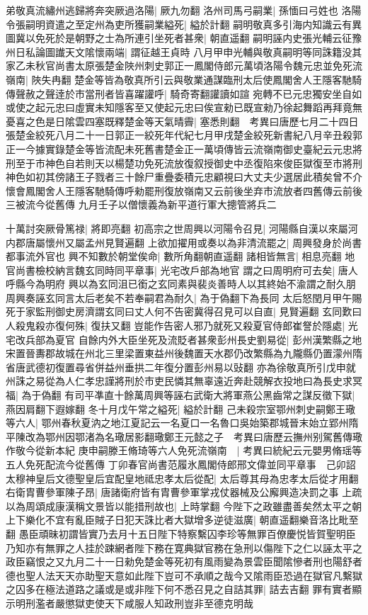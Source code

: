 弟敬真流繡州逃歸將奔突厥過洛陽|{
	厥九勿翻}
洛州司馬弓嗣業|{
	孫愐曰弓姓也}
洛陽令張嗣明資遣之至定州為吏所獲嗣業縊死|{
	縊於計翻}
嗣明敬真多引海内知識云有異圖冀以免死於是朝野之士為所連引坐死者甚衆|{
	朝直遥翻}
嗣明誣内史張光輔云征豫州日私論圖䜟天文隂懷兩端|{
	謂征越王貞時}
八月甲申光輔與敬真嗣明等同誅籍没其家乙未秋官尚書太原張楚金陜州刺史郭正一鳳閣侍郎元萬頃洛陽令魏元忠並免死流嶺南|{
	陜失冉翻}
楚金等皆為敬真所引云與敬業通謀臨刑太后使鳳閣舍人王隱客馳騎傳聲赦之聲逹於市當刑者皆喜躍讙呼|{
	騎奇寄翻讙讀如諠}
宛轉不已元忠獨安坐自如或使之起元忠曰虛實未知隱客至又使起元忠曰俟宣勑已既宣勑乃徐起舞蹈再拜竟無憂喜之色是日隂雲四塞既釋楚金等天氣晴霽|{
	塞悉則翻　考異曰唐歷七月二十四日張楚金絞死八月二十一日郭正一絞死年代紀七月甲戌楚金絞死新書紀八月辛丑殺郭正一今據實錄楚金等皆流配未死舊書楚金正一萬頃傳皆云流嶺南御史臺紀云元忠將刑至于市神色自若則天以楊楚功免死流放復叙授御史中丞復陷來俊臣獄復至市將刑神色如初其傍諸王子戮者三十餘尸重疊委積元忠顧視曰大丈夫少選居此積矣曾不介懷會鳳閣舍人王隱客馳騎傳呼勑罷刑復放嶺南又云前後坐弃市流放者四舊傳云前後三被流今從舊傳}
九月壬子以僧懷義為新平道行軍大摠管將兵二

十萬討突厥骨篤禄|{
	將即亮翻}
初高宗之世周興以河陽令召見|{
	河陽縣自漢以來屬河内郡唐屬懷州又屬孟州見賢遍翻}
上欲加擢用或奏以為非清流罷之|{
	周興發身於尚書都事流外官也}
興不知數於朝堂俟命|{
	數所角翻朝直遥翻}
諸相皆無言|{
	相息亮翻}
地官尚書檢校納言魏玄同時同平章事|{
	光宅改戶部為地官}
謂之曰周明府可去矣|{
	唐人呼縣今為明府}
興以為玄同沮已銜之玄同素與裴炎善時人以其終始不渝謂之耐久朋周興奏誣玄同言太后老矣不若奉嗣君為耐久|{
	為于偽翻下為長同}
太后怒閏月甲午賜死于家監刑御史房濟謂玄同曰丈人何不告密冀得召見可以自直|{
	見賢遍翻}
玄同歎曰人殺鬼殺亦復何殊|{
	復扶又翻}
豈能作告密人邪乃就死又殺夏官侍郎崔詧於隱處|{
	光宅改兵部為夏官}
自餘内外大臣坐死及流貶者甚衆彭州長史劉易從|{
	彭州漢繁縣之地宋置晉夀郡故城在州北三里梁置東益州後魏置天水郡仍改繁縣為九隴縣仍置濛州隋省唐武德初復置尋省併益州垂拱二年復分置彭州易以䜴翻}
亦為徐敬真所引戊申就州誅之易從為人仁孝忠謹將刑於市吏民憐其無辜遠近奔赴競解衣投地曰為長史求冥福|{
	為于偽翻}
有司平凖直十餘萬周興等誣右武衛大將軍燕公黑齒常之謀反徵下獄|{
	燕因肩翻下遐嫁翻}
冬十月戊午常之縊死|{
	縊於計翻}
己未殺宗室鄂州刺史嗣鄭王璥等六人|{
	鄂州春秋夏汭之地江夏記云一名夏口一名魯口吳始築郡城晉末始立郢州隋平陳改為鄂州因鄂渚為名璥居影翻璥鄭王元懿之子　考異曰唐歷云撫州别駕舊傳璥作敬今從新本紀}
庚申嗣滕王脩琦等六人免死流嶺南　|{
	考異曰統紀云元嬰男脩瑶等五人免死配流今從舊傳}
丁卯春官尚書范履氷鳳閣侍郎邢文偉並同平章事　己卯詔太穆神皇后文德聖皇后宜配皇地祗忠孝太后從配|{
	太后尊其母為忠孝太后從才用翻}
右衛胄曹參軍陳子昂|{
	唐諸衛府皆有胄曹參軍掌戎仗器械及公廨興造决罰之事}
上疏以為周頌成康漢稱文景皆以能措刑故也|{
	上時掌翻}
今陛下之政雖盡善矣然太平之朝上下樂化不宜有亂臣賊子日犯天誅比者大獄增多逆徒滋廣|{
	朝直遥翻樂音洛比毗至翻}
愚臣頑昧初謂皆實乃去月十五日陛下特察繫囚李珍等無罪百僚慶悦皆賀聖明臣乃知亦有無罪之人挂於踈網者陛下務在寛典獄官務在急刑以傷陛下之仁以誣太平之政臣竊恨之又九月二十一日勑免楚金等死初有風雨變為景雲臣聞隂慘者刑也陽舒者德也聖人法天天亦助聖天意如此陛下豈可不承順之哉今又隂雨臣恐過在獄官凡繫獄之囚多在極法道路之議或是或非陛下何不悉召見之自詰其罪|{
	詰去吉翻}
罪有實者顯示明刑濫者嚴懲獄吏使天下咸服人知政刑豈非至德克明哉

